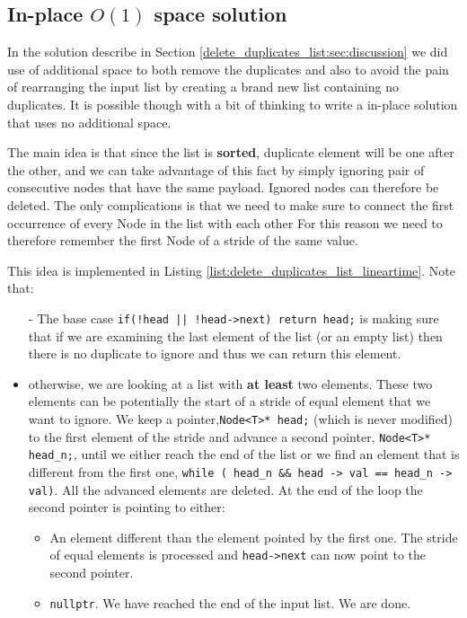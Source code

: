 \subsection{In-place $O(1)$ space solution}
\label{delete_duplicates_list:sec:linear_space}
In the solution describe in Section \ref{delete_duplicates_list:sec:discussion} we did use of additional space to both remove the duplicates and also to avoid the pain of rearranging the input list by creating a brand new list containing no duplicates. It is possible though with a bit of thinking to write a in-place solution that uses no additional space. 

The main idea is that since the list is \textbf{sorted}, duplicate element will be one after the other, and we can take advantage of this fact by simply ignoring pair of consecutive nodes that have the same payload. Ignored nodes can therefore be deleted. The only complications is that we need to make sure to connect the first occurrence of every Node in the list with each other For this reason we need to therefore remember the first Node of a stride of the same value.

This idea is implemented in Listing \ref{list:delete_duplicates_list_lineartime}. Note that:

\begin{itemize}
	\item[-] The base case \lstinline[columns=fixed]{if(!head || !head->next) return head;} is making sure that if we are examining the last element of the list (or an empty list) then there is no duplicate to ignore and thus we can return this element.
	\item[-] otherwise, we are looking at a list with \textbf{at least} two elements. These two elements can be potentially the start of a stride of equal element that we want to ignore. We keep a pointer,\lstinline[columns=fixed]{Node<T>* head;} (which is never modified) to the first element  of the stride and advance a second pointer, \lstinline[columns=fixed]{Node<T>* head_n;}, until we either reach the end of the list or we find an element that is different from the first one, \lstinline[columns=fixed]{while ( head_n && head -> val == head_n -> val)}. All the advanced elements are deleted. At the end of the loop the second pointer  is pointing to either:
	\begin{itemize}
		\item[-] An element different than the element pointed by the first one. The stride of equal elements is processed and  \lstinline[columns=fixed]{head->next} can now point to the second pointer.
		\item[-] \lstinline[columns=fixed]{nullptr}. We have reached the end of the input list. We are done.
	\end{itemize}
\end{itemize}

